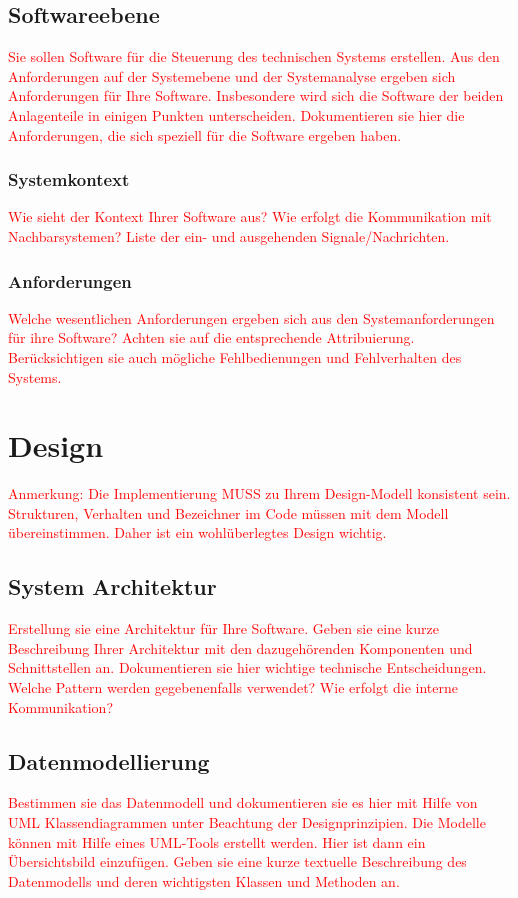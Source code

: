 \documentclass[a4paper, 11pt]{article}
\begin{document}
\subsection{Softwareebene}
\textcolor{red}{Sie sollen Software für die Steuerung des technischen Systems erstellen. Aus den Anforderungen auf der Systemebene und der Systemanalyse ergeben sich Anforderungen für Ihre Software. Insbesondere wird sich die Software der beiden Anlagenteile in einigen Punkten unterscheiden. Dokumentieren sie hier die Anforderungen, die sich speziell für die Software ergeben haben.}

\subsubsection{Systemkontext}
\textcolor{red}{Wie sieht der Kontext Ihrer Software aus? Wie erfolgt die Kommunikation mit Nachbarsystemen? Liste der ein- und ausgehenden Signale/Nachrichten.}

\subsubsection{Anforderungen}
\textcolor{red}{Welche wesentlichen Anforderungen ergeben sich aus den Systemanforderungen für ihre Software? Achten sie auf die entsprechende Attribuierung. Berücksichtigen sie auch mögliche Fehlbedienungen und Fehlverhalten des Systems.}

\section{Design}
\textcolor{red}{Anmerkung: Die Implementierung MUSS zu Ihrem Design-Modell konsistent sein. Strukturen, Verhalten und Bezeichner im Code müssen mit dem Modell übereinstimmen. Daher ist ein wohlüberlegtes Design wichtig.}

\subsection{System Architektur}
\textcolor{red}{Erstellung sie eine Architektur für Ihre Software. Geben sie eine kurze Beschreibung Ihrer Architektur mit den dazugehörenden Komponenten und Schnittstellen an. Dokumentieren sie hier wichtige technische Entscheidungen. Welche Pattern werden gegebenenfalls verwendet? Wie erfolgt die interne Kommunikation?}

\subsection{Datenmodellierung}
\textcolor{red}{Bestimmen sie das Datenmodell und dokumentieren sie es hier mit Hilfe von UML Klassendiagrammen unter Beachtung der Designprinzipien. Die Modelle können mit Hilfe eines UML-Tools erstellt werden. Hier ist dann ein Übersichtsbild einzufügen.
Geben sie eine kurze textuelle Beschreibung des Datenmodells und deren wichtigsten Klassen und Methoden an.
}
\end{document}
